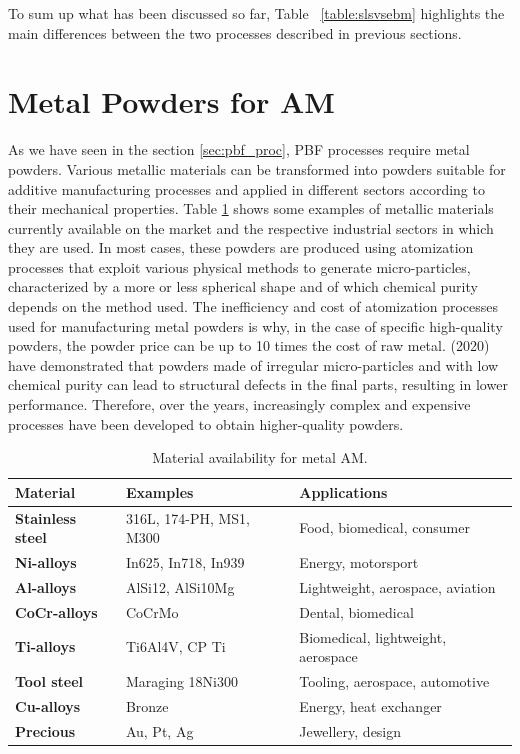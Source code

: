 To sum up what has been discussed so far, Table ~\ref{table:slsvsebm} highlights the main differences between the two processes described in previous sections.


\section{Metal Powders for AM} 
\label{sec:metalpowders}
As we have seen in the section \ref{sec:pbf_proc}, PBF processes require metal powders. Various metallic materials can be transformed into powders suitable for additive manufacturing processes and applied in different sectors according to their mechanical properties. Table \ref{table:materialAMmetal} shows some examples of metallic materials currently available on the market and the respective industrial sectors in which they are used. In most cases, these powders are produced using atomization processes that exploit various physical methods to generate micro-particles, characterized by a more or less spherical shape and of which chemical purity depends on the method used. The inefficiency and cost of atomization processes used for manufacturing metal powders is why, in the case of specific high-quality powders, the powder price can be up to 10 times the cost of raw metal. \citeauthor{deng_origin_2020} (2020) have demonstrated that powders made of irregular micro-particles and with low chemical purity can lead to structural defects in the final parts, resulting in lower performance. Therefore, over the years, increasingly complex and expensive processes have been developed to obtain higher-quality powders.
\begin{table}[H]
\centering 
\small
    \begin{tabular}{|l l l|}
    \hline
    \rowcolor{bluepoli!40}
    \textbf{Material} & \textbf{Examples} & \textbf{Applications}\\
    \hline \hline
    \textbf{Stainless steel} & 316L, 174-PH, MS1, M300 & Food, biomedical, consumer \T\B\\
    \textbf{Ni-alloys} & In625, In718, In939 & Energy, motorsport\T\B\\
    \textbf{Al-alloys} & AlSi12, AlSi10Mg & Lightweight, aerospace, aviation\T\B\\
    \textbf{CoCr-alloys} & CoCrMo & Dental, biomedical\T\B\\
    \textbf{Ti-alloys} & Ti6Al4V, CP Ti & Biomedical, lightweight, aerospace\T\B\\
    \textbf{Tool steel} & Maraging 18Ni300 & Tooling, aerospace, automotive\T\B\\
    \textbf{Cu-alloys} & Bronze & Energy, heat exchanger\T\B\\
    \textbf{Precious} & Au, Pt, Ag & Jewellery, design\T\B\\
    \hline
    \end{tabular}
    \\[10pt]
    \caption{Material availability for metal AM.}
    \label{table:materialAMmetal}
\end{table}
